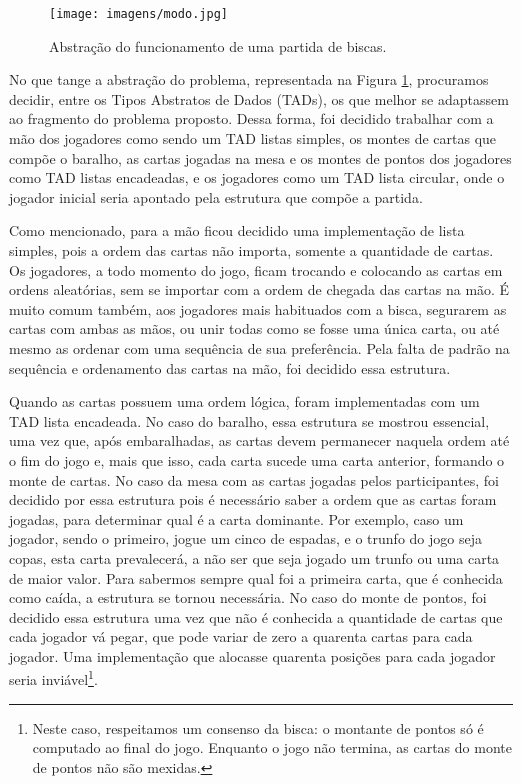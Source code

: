 \documentclass[12pt, oneside, a4paper, brazil]{abntex2}
\begin{document}
\begin{figure}[H]
    \centering
    \texttt{[image: imagens/modo.jpg]}
    \caption{Abstração do funcionamento de uma partida de biscas.}
    \label{fig:modo}
\end{figure}

No que tange a abstração do problema, representada na Figura \ref{fig:modo}, procuramos decidir, entre os Tipos Abstratos de Dados (TADs), os que melhor se adaptassem ao fragmento do problema proposto. Dessa forma, foi decidido trabalhar com a mão dos jogadores como sendo um TAD listas simples, os montes de cartas que compõe o baralho, as cartas jogadas na mesa e os montes de pontos dos jogadores como TAD listas encadeadas, e os jogadores como um TAD lista circular, onde o jogador inicial seria apontado pela estrutura que compõe a partida.

Como mencionado, para a mão ficou decidido uma implementação de lista simples, pois a ordem das cartas não importa, somente a quantidade de cartas. Os jogadores, a todo momento do jogo, ficam trocando e colocando as cartas em ordens aleatórias, sem se importar com a ordem de chegada das cartas na mão. É muito comum também, aos jogadores mais habituados com a bisca, segurarem as cartas com ambas as mãos, ou unir todas como se fosse uma única carta, ou até mesmo as ordenar com uma sequência de sua preferência. Pela falta de padrão na sequência e ordenamento das cartas na mão, foi decidido essa estrutura.

Quando as cartas possuem uma ordem lógica, foram implementadas com um TAD lista encadeada. No caso do baralho, essa estrutura se mostrou essencial, uma vez que, após embaralhadas, as cartas devem permanecer naquela ordem até o fim do jogo e, mais que isso, cada carta sucede uma carta anterior, formando o monte de cartas. No caso da mesa com as cartas jogadas pelos participantes, foi decidido por essa estrutura pois é necessário saber a ordem que as cartas foram jogadas, para determinar qual é a carta dominante. Por exemplo, caso um jogador, sendo o primeiro, jogue um cinco de espadas, e o trunfo do jogo seja copas, esta carta prevalecerá, a não ser que seja jogado um trunfo ou uma carta de maior valor. Para sabermos sempre qual foi a primeira carta, que é conhecida como caída, a estrutura se tornou necessária. No caso do monte de pontos, foi decidido essa estrutura uma vez que não é conhecida a quantidade de cartas que cada jogador vá pegar, que pode variar de zero a quarenta cartas para cada jogador. Uma implementação que alocasse quarenta posições para cada jogador seria inviável\footnote{Neste caso, respeitamos um consenso da bisca: o montante de pontos só é computado ao final do jogo. Enquanto o jogo não termina, as cartas do monte de pontos não são mexidas.}.
\end{document}
